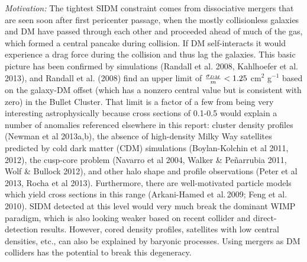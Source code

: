 {\it Motivation:} The tightest SIDM constraint comes from dissociative mergers
that are seen soon after first pericenter passage, when the mostly collisionless
galaxies and DM have passed through each other and proceeded ahead of much of
the gas, which formed a central pancake during collision.  If DM self-interacts
it would experience a drag force during the collision and thus lag the galaxies.
This basic picture has been confirmed by simulations (Randall et al. 2008,
Kahlhoefer et al. 2013), and Randall et al. (2008) find an upper limit of
${\sigma_{DM}\over m} < 1.25$ cm$^2$ g$^{-1}$ based on the galaxy-DM offset
(which has a nonzero central value but is consistent with zero) in the Bullet
Cluster.  That limit is a factor of a few from being very interesting
astrophysically because cross sections of 0.1-0.5 would explain a number of
anomalies referenced elsewhere in this report: cluster density profiles (Newman
et al 2013a,b), the absence of high-density Milky Way satellites predicted by
cold dark matter (CDM) simulations (Boylan-Kolchin et al 2011, 2012), the
cusp-core problem (Navarro et al 2004, Walker \& Pe\~{n}arrubia 2011, Wolf \&
Bullock 2012), and other halo shape and profile observations (Peter et al 2013,
Rocha et al 2013).  Furthermore, there are well-motivated particle models which
yield cross sections in this range (Arkani-Hamed et al.\,2009; Feng et
al.\,2010).  SIDM detected at this level would very much break the dominant WIMP
paradigm, which is also looking weaker based on recent collider and
direct-detection results.  However, cored density profiles, satellites with low
central densities, etc., can also be explained by baryonic processes. Using
mergers as DM colliders has the potential to break this degeneracy.

